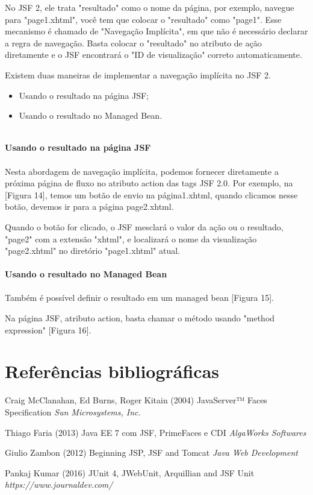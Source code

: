 \documentclass[	DIV=calc,%
							paper=a4,%
							fontsize=12pt,%
							onecolumn]{scrartcl}	 					%
\begin{document}
No JSF 2, ele trata "resultado" como o nome da página, por exemplo, navegue para "page1.xhtml", você tem que colocar o "resultado" como "page1". Esse mecanismo é chamado de "Navegação Implícita", em que não é necessário declarar a regra de navegação. Basta colocar o "resultado" no atributo de ação diretamente e o JSF encontrará o "ID de visualização" correto automaticamente.

Existem duas maneiras de implementar a navegação implícita no JSF 2.

\begin{itemize}
	\item Usando o resultado na página JSF;
	\item Usando o resultado no Managed Bean.\\~\\
\end{itemize}

\textbf{Usando o resultado na página JSF}\\~\\

Nesta abordagem de navegação implícita, podemos fornecer diretamente a próxima página de fluxo no atributo action das tags JSF 2.0. Por exemplo, na [Figura 14], temos um botão de envio na página1.xhtml, quando clicamos nesse botão, devemos ir para a página page2.xhtml.

Quando o botão for clicado, o JSF mesclará o valor da ação ou o resultado, "page2" com a extensão "xhtml", e localizará o nome da visualização "page2.xhtml" no diretório "page1.xhtml" atual.\\~\\


\textbf{Usando o resultado no Managed Bean}\\~\\

Também é possível definir o resultado em um managed bean [Figura 15].

Na página JSF, atributo action, basta chamar o método usando "method expression" [Figura 16].


\section{Referências bibliográficas}

\footnotesize{

	\begin{thebibliography}{99}
		 Craig McClanahan, Ed Burns, Roger Kitain (2004)
		\newblock JavaServer™ Faces Specification
		\newblock \emph{Sun Microsystems, Inc.}

		 Thiago Faria (2013)
		\newblock Java EE 7 com JSF, PrimeFaces e CDI
		\newblock \emph{AlgaWorks Softwares}

		 Giulio Zambon (2012)
		\newblock Beginning JSP, JSF and Tomcat
		\newblock \emph{Java Web Development}

		 Pankaj Kumar (2016)
		\newblock JUnit 4, JWebUnit, Arquillian and JSF Unit 
		\newblock \emph{https://www.journaldev.com/}
	\end{thebibliography}
}
\end{document}
